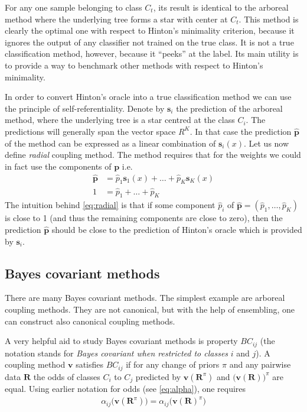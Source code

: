 For any one sample belonging to class $C_t$, its result is identical to the arboreal method where the underlying tree forms a star with center at $C_t$. This method is clearly the optimal one with respect to Hinton's minimality criterion, because it ignores the output of any classifier not trained on the true class. It is not a true classification method, however, because it ``peeks'' at the label. Its main utility is to provide a way to benchmark other methods with respect to Hinton's minimality.

In order to convert Hinton's oracle into a true classification method we can use the principle of self-referentiality.  Denote by $\boldsymbol{s}_i$ the prediction of the arboreal method, where the underlying tree is a star centred at the class $C_i$. The predictions will generally span the vector space $R^K$. In that case the prediction $\hat{\boldsymbol{p}}$ of the method  can be expressed as a linear combination of $\boldsymbol{s}_i(x)$. Let us now define \emph{radial} coupling method. The  method requires that for the  weights we could in fact use the components of $\boldsymbol{p}$ i.e.
\begin{equation}
	\begin{split}
	\hat {\boldsymbol{p}} &= \hat p_1 \boldsymbol{s}_1(x) + \ldots + \hat p_K \boldsymbol{s}_K(x)\\
	1 &= \hat p_1 + \ldots + \hat p_K
	\end{split}
	 \label{eq:radial}
\end{equation}
%
The intuition behind \eqref{eq:radial} is that if some component $\hat p_i$ of $\hat{\boldsymbol{p}} =(\hat p_1, \ldots, \hat p_K) $ is close to 1 (and thus the remaining components are close to zero), then the prediction $\hat{\boldsymbol{p}}$ should be close to the prediction of Hinton's oracle which is provided by ${\boldsymbol{s}}_i$.

\subsection{Bayes covariant methods} \label{sec:bc2}

There are many Bayes covariant methods. The simplest example are arboreal coupling methods. They are not canonical, but with the help of ensembling, one can construct also canonical coupling methods. 

A very helpful aid to study Bayes covariant methods is property $BC_{ij}$ (the notation stands for \emph{Bayes covariant when restricted to classes} $i$ and $j$). A coupling method $\boldsymbol{v}$ satisfies $BC_{ij}$ if for any change of priors $\pi$ and any  pairwise data $\boldsymbol{R}$ the odds of classes $C_i$ to $C_j$ predicted by $\boldsymbol{v}(\boldsymbol{R}^\pi)$ and $\bigl(\boldsymbol{v}(\boldsymbol{R})\bigr)^\pi$ are equal. Using earlier notation for odds (see \eqref{eq:alpha}), one requires
\begin{align}
	\alpha_{ij} \bigl(\boldsymbol{v}(\boldsymbol{R}^\pi) \bigr) = \alpha_{ij} \bigl(\boldsymbol{v}(\boldsymbol{R})^\pi \bigr)
\end{align}

